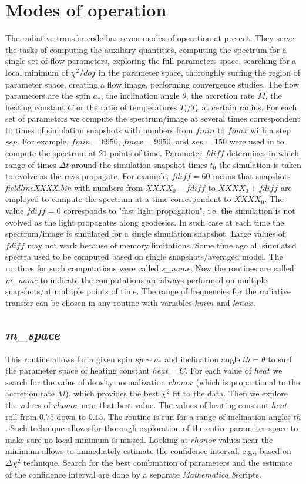 \documentclass{emulateapj}
\newcommand{\mat}{\textit{Mathematica 8}}
\begin{document}
\section{Modes of operation}
The radiative transfer code has seven modes of operation at present. They serve the tasks of computing the auxiliary quantities,
computing the spectrum for a single set of flow parameters, exploring the full parameters space, searching for a local minimum of $\chi^2/dof$ in the parameter space,
thoroughly surfing the region of parameter space, creating a flow image, performing convergence studies.
The flow parameters are the spin $a_*$, the inclination angle $\theta$, the accretion rate $\dot{M}$, the heating constant $C$ or the ratio of temperatures $T_i/T_e$ at certain radius.
For each set of parameters we compute the spectrum/image at several times correspondent to times of simulation snapshots with numbers from $fmin$ to $fmax$ with a step $sep$.
For example, $fmin=6950$, $fmax=9950$, and $sep=150$ were used in \citet{Shcherbakov:2012appl} to compute the spectrum at $21$ points of time.
Parameter $fdiff$ determines in which range of times $\Delta t$ around the simulation snapshot times $t_0$ the simulation is taken to evolve as the rays propagate.
For example, $fdiff=60$ means that snapshots \textit{fieldlineXXXX.bin} with numbers from $XXXX_0-fdiff$ to $XXXX_0+fdiff$ are employed to compute the spectrum at 
a time correspondent to $XXXX_0$. The value $fdiff=0$ corresponds to "fast light propagation", i.e. the simulation is not evolved as the light propagates along geodesics.
In such case at each time the spectrum/image is simulated for a single simulation snapshot. Large values of $fdiff$ may not work because of memory limitations.
Some time ago all simulated spectra used to be computed based on single snapshots/averaged model. 
The routines for such computations were called \textit{s\_name}. Now the routines are called \textit{m\_name} to indicate
the computations are always performed on multiple snapshots/at multiple points of time.
The range of frequencies for the radiative transfer can be chosen in any routine with variables $kmin$ and $kmax$.

\subsection{\textit{m\_space}}
This routine allows for a given spin $sp\sim a_*$ and inclination angle $th=\theta$ to surf the parameter space of heating constant $heat=C$.
For each value of $heat$ we search for the value of density normalization $rhonor$ (which is proportional to the accretion rate $\dot{M}$), which provides the best $\chi^2$ fit to the data.
Then we explore the values of $rhonor$ near that best value.
The values of heating constant $heat$ roll from $0.75$ down to $0.15$.
The routine is run for a range of inclination angles $th$.
Such technique allows for thorough exploration of the entire parameter space to make sure no local minimum is missed.
Looking at $rhonor$ values near the minimum allows to immediately estimate the confidence interval, e.g., based on $\Delta\chi^2$ technique.
Search for the best combination of parameters and the estimate of the confidence interval are done by a separate \mat  scripts.
\end{document}
